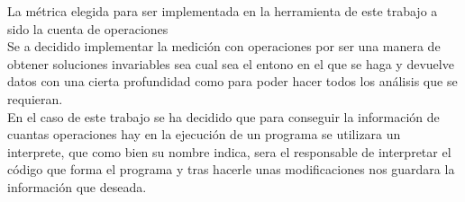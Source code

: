 La métrica elegida para ser implementada en la herramienta de este trabajo a sido la cuenta de operaciones\\
 
Se a decidido implementar la medición con operaciones por ser una manera de obtener soluciones invariables sea cual sea el entono en el que se haga y devuelve datos con una cierta profundidad como para poder hacer todos los análisis que se requieran.\\

En el caso de este trabajo se ha decidido que para conseguir la información de cuantas operaciones hay en la ejecución de un programa se utilizara un interprete, que como bien su nombre indica, sera el responsable de interpretar el código que forma el programa y tras hacerle unas modificaciones nos guardara  la información que deseada. 



